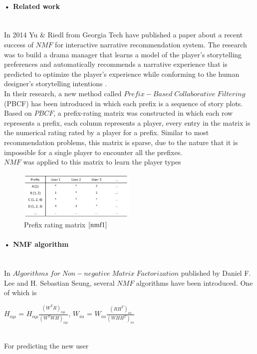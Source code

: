 \documentclass[11pt]{article} %
\begin{document}
\paragraph{• Related work}\mbox{}\\
In 2014 Yu $\&$ Riedl from Georgia Tech have published a paper\cite{nmf1} about a recent success of $NMF$ for interactive narrative recommendation system. The research was to build a drama manager that learns a model of the player’s storytelling preferences and automatically recommends a narrative experience that is predicted to optimize the player’s experience while conforming to the human designer’s storytelling intentions \cite[p.~1]{nmf1}.\\
In their research, a new method called $Prefix-Based\;Collaborative\;Filtering$ (PBCF) \cite[p.~2]{nmf1} has been introduced in which each prefix is a sequence of story plots. Based on $PBCF$, a prefix-rating matrix was constructed in which each row represents a prefix, each column represents a player, every entry in the matrix is the numerical rating rated by a player for a prefix. Similar to most recommendation problems, this matrix is sparse, due to the nature that it is impossible for a single player to encounter all the prefixes.\\
$NMF$ was applied to this matrix to learn the player types
\begin{figure}[H]
\caption{Prefix rating matrix $\cite[p.~4]{nmf1}$}
\centering
\includegraphics[width=0.5\textwidth]{prefixrating}
\end{figure}

\paragraph{• NMF algorithm}\mbox{}\\
In $Algorithms\;for\;Non-negative\;Matrix\; Factorization$ published by Daniel F. Lee and H. Sebastian Seung, several $NMF$ algorithms have been introduced. One of which is\\
\centerline{$H_{\alpha\mu}$ = $H_{\alpha\mu}\frac{(W^{T}R)_{\alpha\mu}}{(W^{T}WH)_{\alpha\mu}}$, $W_{i\alpha}$ = $W_{i\alpha}\frac{(RH^{T})_{i\alpha}}{(WHH^{T})_{i\alpha}}$ \cite[p.~3]{nmfalg}}\\
For predicting the new user 
\end{document}

